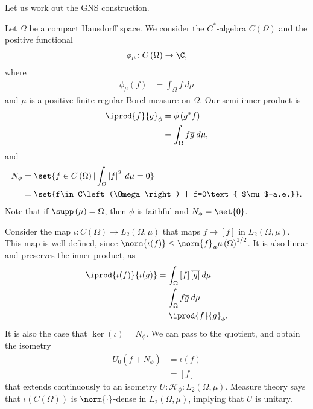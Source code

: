 \documentclass[10pt]{mypackage}
\begin{document}
Let us work out the GNS construction.
\begin{example}
  Let $\Omega$ be a compact Hausdorff space. We consider the $C^{\ast}$-algebra $C\left(\Omega\right)$ and the positive functional
  \begin{align*}
    \phi_{\mu}\colon C\left(\Omega\right)\rightarrow \C,
  \end{align*}
  where
  \begin{align*}
    \phi_{\mu}\left(f\right) &= \int_{\Omega}^{} f\:d\mu
  \end{align*}
  and $\mu$ is a positive finite regular Borel measure on $\Omega$. Our semi inner product is
  \begin{align*}
    \iprod{f}{g}_{\phi} &= \phi\left(g^{\ast}f\right)\\
                        &= \int_{\Omega}^{} f\overline{g}\:d\mu,
  \end{align*}
  and
  \begin{align*}
    N_{\phi} &= \set{f\in C\left(\Omega\right) | \int_{\Omega}^{} \left\vert f \right\vert^2\:d\mu = 0}\\
             &= \set{f\in C\left(\Omega\right) | f=0\text{ $\mu$-a.e.}}.
  \end{align*}
  Note that if $\supp\left(\mu\right) = \Omega$, then $\phi$ is faithful and $N_{\phi} = \set{0}$.\newline

  Consider the map $\iota\colon C\left(\Omega\right)\rightarrow L_2\left(\Omega,\mu\right)$ that maps $f\mapsto \left[f\right]$ in $L_2\left(\Omega,\mu\right)$. This map is well-defined, since $\norm{\iota(f)}\leq \norm{f}_{u}\mu\left(\Omega\right)^{1/2}$. It is also linear and preserves the inner product, as
  \begin{align*}
    \iprod{\iota(f)}{\iota(g)} &= \int_{\Omega}^{} \left[f\right]\overline{\left[g\right]}\:d\mu\\
                               &= \int_{\Omega}^{} f \overline{g}\:d\mu\\
                               &= \iprod{f}{g}_{\phi}.
  \end{align*}
  It is also the case that $\ker\left(\iota\right) = N_{\phi}$. We can pass to the quotient, and obtain the isometry
  \begin{align*}
    U_0\left(f + N_{\phi}\right) &= \iota\left(f\right)\\
                                 &= \left[f\right]
  \end{align*}
  that extends continuously to an isometry $U\colon \mathcal{H}_{\phi}\colon L_2\left(\Omega,\mu\right)$. Measure theory says that $\iota\left(C\left(\Omega\right)\right)$ is $\norm{\cdot}$-dense in $L_2\left(\Omega,\mu\right)$, implying that $U$ is unitary.\newline


\end{example}
\end{document}
